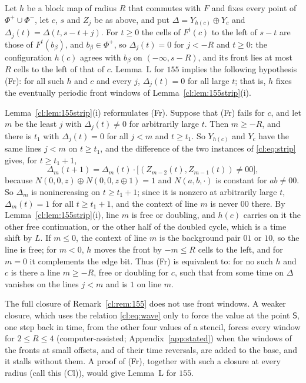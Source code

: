 \begin{remark}\label{cl:rem:155G1}
Let $h$ be a block map of radius $R$ that commutes with $F$ and fixes every point of $\Phi^+\cup\Phi^-$, let $c$, $s$ and $Z_j$ be as above, and put $\Delta=Y_{h(c)}\oplus Y_c$ and $\Delta_j(t)=\Delta(t,s-t+j)$. For $t\ge0$ the cells of $F^t(c)$ to the left of $s-t$ are those of $F^t(b_\beta)$, and $b_\beta\in\Phi^+$, so $\Delta_j(t)=0$ for $j<-R$ and $t\ge0$: the configuration $h(c)$ agrees with $b_\beta$ on $(-\infty,s-R)$, and its front lies at most $R$ cells to the left of that of $c$. Lemma~L for $155$ implies the following hypothesis (Fr): for all such $h$ and $c$ and every $j$, $\Delta_j(t)=0$ for all large $t$; that is, $h$ fixes the eventually periodic front windows of Lemma~\ref{cl:lem:155strip}(i).

Lemma~\ref{cl:lem:155strip}(i) reformulates (Fr). Suppose that (Fr) fails for $c$, and let $m$ be the least $j$ with $\Delta_j(t)\ne0$ for arbitrarily large $t$. Then $m\ge-R$, and there is $t_1$ with $\Delta_j(t)=0$ for all $j<m$ and $t\ge t_1$. So $Y_{h(c)}$ and $Y_c$ have the same lines $j<m$ on $t\ge t_1$, and the difference of the two instances of \eqref{cl:eq:strip} gives, for $t\ge t_1+1$,
\[
\Delta_m(t+1)=\Delta_m(t)\cdot\bigl[(Z_{m-2}(t),Z_{m-1}(t))\ne00\bigr],
\]
because $N(0,0,z)\oplus N(0,0,z\oplus1)=1$ and $N(a,b,\cdot)$ is constant for $ab\ne00$. So $\Delta_m$ is nonincreasing on $t\ge t_1+1$; since it is nonzero at arbitrarily large $t$, $\Delta_m(t)=1$ for all $t\ge t_1+1$, and the context of line $m$ is never $00$ there. By Lemma~\ref{cl:lem:155strip}(i), line $m$ is free or doubling, and $h(c)$ carries on it the other free continuation, or the other half of the doubled cycle, which is a time shift by $L$. If $m\le0$, the context of line $m$ is the background pair $01$ or $10$, so the line is free; for $m<0$, $h$ moves the front by $-m\le R$ cells to the left, and for $m=0$ it complements the edge bit. Thus (Fr) is equivalent to: for no such $h$ and $c$ is there a line $m\ge-R$, free or doubling for $c$, such that from some time on $\Delta$ vanishes on the lines $j<m$ and is $1$ on line $m$.

The full closure of Remark~\ref{cl:rem:155} does not use front windows. A weaker closure, which uses the relation \eqref{cl:eq:wave} only to force the value at the point $\mathsf S$, one step back in time, from the other four values of a stencil, forces every window for $2\le R\le4$ (computer-assisted; Appendix~\ref{app:stated}) when the windows of the fronts at small offsets, and of their time reversals, are added to the base, and it stalls without them. A proof of (Fr), together with such a closure at every radius (call this (Cl)), would give Lemma~L for $155$.
\end{remark}
